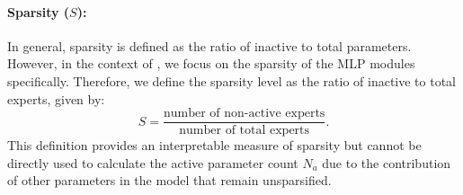 \paragraph{Sparsity (\(S\)):} In general, sparsity is defined as the ratio of inactive to total parameters. However, in the context of \moes, we focus on the sparsity of the MLP modules specifically. Therefore, we define the sparsity level as the ratio of inactive to total experts, given by:
\begin{equation}
    S = \frac{\text{number of non-active experts}}{\text{number of total experts}}.
    \label{eqn:moe:sparsity}
\end{equation}
This definition provides an interpretable measure of sparsity but cannot be directly used to calculate the active parameter count \(N_a\) due to the contribution of other parameters in the model that remain unsparsified. %




\newpage